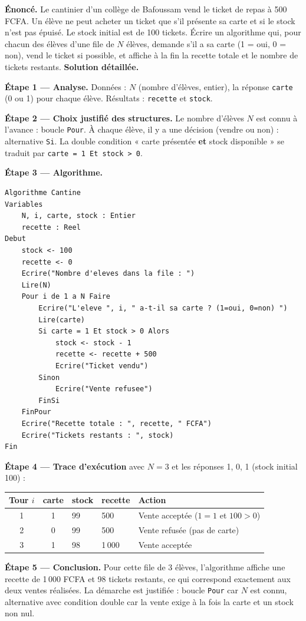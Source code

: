 \documentclass[11pt]{article}
\begin{document}
\begin{exoresolu}
\textbf{Énoncé.} Le cantinier d'un collège de Bafoussam vend le ticket de repas à 500 FCFA. Un élève ne peut acheter un ticket que s'il présente sa carte et si le stock n'est pas épuisé. Le stock initial est de 100 tickets. Écrire un algorithme qui, pour chacun des élèves d'une file de $N$ élèves, demande s'il a sa carte (1 = oui, 0 = non), vend le ticket si possible, et affiche à la fin la recette totale et le nombre de tickets restants.
\tcblower
\textbf{Solution détaillée.}

\textbf{Étape 1 — Analyse.} Données : $N$ (nombre d'élèves, entier), la réponse \texttt{carte} (0 ou 1) pour chaque élève. Résultats : \texttt{recette} et \texttt{stock}. 

\textbf{Étape 2 — Choix justifié des structures.} Le nombre d'élèves $N$ est connu à l'avance : boucle \texttt{Pour}. À chaque élève, il y a une décision (vendre ou non) : alternative \texttt{Si}. La double condition « carte présentée \textbf{et} stock disponible » se traduit par \texttt{carte = 1 Et stock > 0}.

\textbf{Étape 3 — Algorithme.}
\begin{lstlisting}
Algorithme Cantine
Variables
    N, i, carte, stock : Entier
    recette : Reel
Debut
    stock <- 100
    recette <- 0
    Ecrire("Nombre d'eleves dans la file : ")
    Lire(N)
    Pour i de 1 a N Faire
        Ecrire("L'eleve ", i, " a-t-il sa carte ? (1=oui, 0=non) ")
        Lire(carte)
        Si carte = 1 Et stock > 0 Alors
            stock <- stock - 1
            recette <- recette + 500
            Ecrire("Ticket vendu")
        Sinon
            Ecrire("Vente refusee")
        FinSi
    FinPour
    Ecrire("Recette totale : ", recette, " FCFA")
    Ecrire("Tickets restants : ", stock)
Fin
\end{lstlisting}

\textbf{Étape 4 — Trace d'exécution} avec $N = 3$ et les réponses 1, 0, 1 (stock initial 100) :
\begin{center}
\begin{tabularx}{\linewidth}{|c|c|X|X|l|}
\hline
\rowcolor{popblueL} Tour $i$ & carte & stock & recette & Action \\
\hline
1 & 1 & 99 & 500 & Vente acceptée ($1=1$ et $100>0$) \\
\hline
2 & 0 & 99 & 500 & Vente refusée (pas de carte) \\
\hline
3 & 1 & 98 & 1\,000 & Vente acceptée \\
\hline
\end{tabularx}
\end{center}

\textbf{Étape 5 — Conclusion.} Pour cette file de 3 élèves, l'algorithme affiche une recette de 1\,000 FCFA et 98 tickets restants, ce qui correspond exactement aux deux ventes réalisées. La démarche est justifiée : boucle \texttt{Pour} car $N$ est connu, alternative avec condition double car la vente exige à la fois la carte et un stock non nul.
\end{exoresolu}
\end{document}
